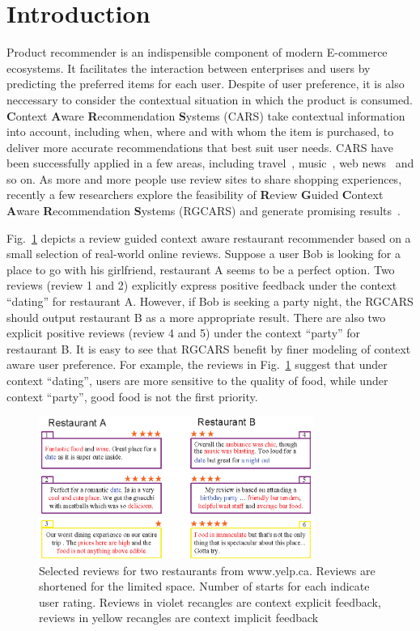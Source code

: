 \documentclass[preprint,12pt]{elsarticle}
\begin{document}
\section{Introduction}\label{sec:intro}
Product recommender is an indispensible component of modern E-commerce ecosystems. It facilitates the interaction between enterprises and users by predicting the preferred items for each user. Despite of user preference, it is also neccessary to consider the contextual situation in which the product is consumed. \textbf{C}ontext \textbf{A}ware \textbf{R}ecommendation \textbf{S}ystems (CARS) take contextual information into account, including when, where and with whom the item is purchased, to deliver more accurate recommendations that best suit user needs. CARS have been successfully applied in a few areas, including travel~\cite{Biancalana2013Approach}, music~\cite{Cai2007MusicSense}, web news~\cite{Wang2015CROWN} and so on. As more and more people use review sites to share shopping experiences, recently a few researchers explore the feasibility of \textbf{R}eview \textbf{G}uided \textbf{C}ontext \textbf{A}ware \textbf{R}ecommendation \textbf{S}ystems (RGCARS) and generate promising results~\cite{Li2010Contextual,Levi2012Finding,Hariri2013Query,Liu2013Combining}. 

Fig.~\ref{fig:example} depicts a review guided context aware restaurant recommender based on a small selection of real-world online reviews. Suppose a user Bob is looking for a place to go with his girlfriend, restaurant A seems to be a perfect option.  Two reviews (review 1 and 2) explicitly express positive feedback under the context ``dating'' for restaurant A. However, if Bob is seeking a party night, the RGCARS should output restaurant B as a more appropriate result. There are also two explicit positive reviews (review 4 and 5) under the context ``party'' for restaurant B. It is easy to see that RGCARS benefit by finer modeling of context aware user preference. For example, the reviews in Fig.~\ref{fig:example} suggest that under context ``dating'', users are more sensitive to the quality of food, while under context ``party'', good food is not the first priority.           



\begin{figure}[!ht]
\label{fig:example}
\centering
\includegraphics[width=0.8\textwidth]{example.eps}
\caption{Selected reviews for two restaurants from www.yelp.ca. Reviews are shortened for the limited space. Number of starts for each indicate user rating. Reviews in violet recangles are context explicit feedback, reviews in yellow recangles are context implicit feedback}
\end{figure}
\end{document}
